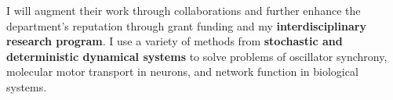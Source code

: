 I will augment their work through collaborations and further enhance the department's reputation through grant funding and my \textbf{interdisciplinary research program}. I use a variety of methods from \textbf{stochastic and deterministic dynamical systems} to solve problems of oscillator synchrony, molecular motor transport in neurons, and network function in biological systems.